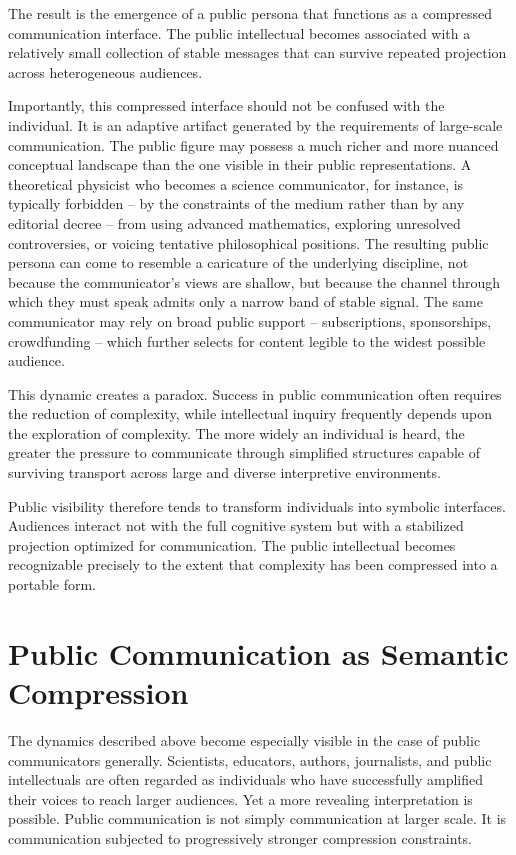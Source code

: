 \documentclass[11pt]{article}
\theoremstyle{plain}
\begin{document}
The result is the emergence of a public persona that functions as a compressed communication interface. The public intellectual becomes associated with a relatively small collection of stable messages that can survive repeated projection across heterogeneous audiences.

Importantly, this compressed interface should not be confused with the individual. It is an adaptive artifact generated by the requirements of large-scale communication. The public figure may possess a much richer and more nuanced conceptual landscape than the one visible in their public representations. A theoretical physicist who becomes a science communicator, for instance, is typically forbidden -- by the constraints of the medium rather than by any editorial decree -- from using advanced mathematics, exploring unresolved controversies, or voicing tentative philosophical positions. The resulting public persona can come to resemble a caricature of the underlying discipline, not because the communicator's views are shallow, but because the channel through which they must speak admits only a narrow band of stable signal. The same communicator may rely on broad public support -- subscriptions, sponsorships, crowdfunding -- which further selects for content legible to the widest possible audience.

This dynamic creates a paradox. Success in public communication often requires the reduction of complexity, while intellectual inquiry frequently depends upon the exploration of complexity. The more widely an individual is heard, the greater the pressure to communicate through simplified structures capable of surviving transport across large and diverse interpretive environments.

Public visibility therefore tends to transform individuals into symbolic interfaces. Audiences interact not with the full cognitive system but with a stabilized projection optimized for communication. The public intellectual becomes recognizable precisely to the extent that complexity has been compressed into a portable form.

\section{Public Communication as Semantic Compression}

The dynamics described above become especially visible in the case of public communicators generally. Scientists, educators, authors, journalists, and public intellectuals are often regarded as individuals who have successfully amplified their voices to reach larger audiences. Yet a more revealing interpretation is possible. Public communication is not simply communication at larger scale. It is communication subjected to progressively stronger compression constraints.
\end{document}
